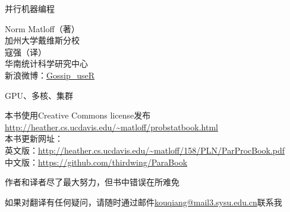 \pagecolor{yellow}
\color{black}

\bigskip
\vspace{0.5in}
\bigskip
\begin{center}
{\Huge 并行机器编程}

{\LARGE Norm Matloff（著）\\
加州大学戴维斯分校\\
\bigskip
寇强（译）\\
\vspace{1 mm}
华南统计科学研究中心\\
\vspace{3 mm}
新浪微博：\href{http://www.weibo.com/thirdwing}{Gossip\_useR}
}





\bigskip

\vspace{0.5in}

{\LARGE GPU、多核、集群}
\end{center}
\vspace{1in}



\vspace{1.5in}
\noindent 本书使用Creative Commons license发布\\
\url{http://heather.cs.ucdavis.edu/~matloff/probstatbook.html}\\
\medskip
\noindent 本书更新网址：\\
英文版：\url{http://heather.cs.ucdavis.edu/~matloff/158/PLN/ParProcBook.pdf}\\
中文版：\url{https://github.com/thirdwing/ParaBook}

\medskip
\noindent 作者和译者尽了最大努力，但书中错误在所难免

\noindent 如果对翻译有任何疑问，请随时通过邮件\href{mailto:kouqiang@mail3.sysu.edu.cn}{kouqiang@mail3.sysu.edu.cn}联系我
\newpage
